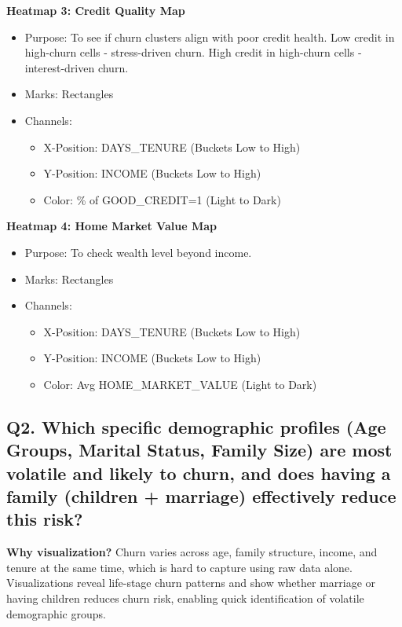 \documentclass[10pt,a4paper]{article}
\begin{document}
\textbf{Heatmap 3: Credit Quality Map}
\begin{itemize}[itemsep=0pt]
    \item Purpose: To see if churn clusters align with poor credit health. Low credit in high-churn cells - stress-driven churn. High credit in high-churn cells - interest-driven churn.
    \item Marks: Rectangles
    \item Channels: 
    \begin{itemize}[itemsep=0pt]
        \item X-Position: DAYS\_TENURE (Buckets Low to High)
        \item Y-Position: INCOME (Buckets Low to High)
        \item Color: \% of GOOD\_CREDIT=1 (Light to Dark)
    \end{itemize}
\end{itemize}

\textbf{Heatmap 4: Home Market Value Map}
\begin{itemize}[itemsep=0pt]
    \item Purpose: To check wealth level beyond income.
    \item Marks: Rectangles
    \item Channels: 
    \begin{itemize}[itemsep=0pt]
        \item X-Position: DAYS\_TENURE (Buckets Low to High)
        \item Y-Position: INCOME (Buckets Low to High)
        \item Color: Avg HOME\_MARKET\_VALUE (Light to Dark)
    \end{itemize}
\end{itemize}

\subsection*{Q2. Which specific demographic profiles (Age Groups, Marital Status, Family Size) are most volatile and likely to churn, and does having a family (children + marriage) effectively reduce this risk?}

\textbf{Why visualization?} Churn varies across age, family structure, income, and tenure at the same time, which is hard to capture using raw data alone. Visualizations reveal life-stage churn patterns and show whether marriage or having children reduces churn risk, enabling quick identification of volatile demographic groups.
\end{document}

